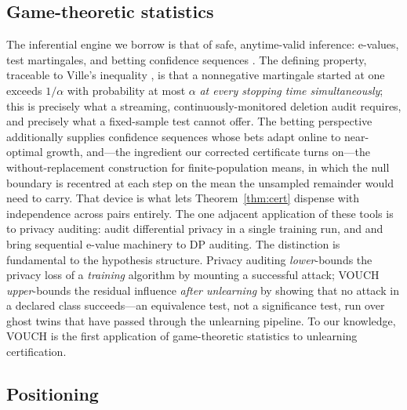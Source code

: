 \subsection{Game-theoretic statistics}

The inferential engine we borrow is that of safe, anytime-valid inference: e-values,
test martingales, and betting confidence sequences
\citep{ramdas2023game,grunwald2024safe,shafer2021testing,waudbysmith2024,howard2021time}.
The defining property, traceable to Ville's inequality \citep{ville1939}, is that a
nonnegative martingale started at one exceeds $1/\alpha$ with probability at most
$\alpha$ \emph{at every stopping time simultaneously}; this is precisely what a
streaming, continuously-monitored deletion audit requires, and precisely what a
fixed-sample test cannot offer. The betting perspective
\citep{waudbysmith2024,orabona2016coin} additionally supplies confidence sequences
whose bets adapt online to near-optimal growth, and---the ingredient our corrected
certificate turns on---the without-replacement construction for finite-population
means, in which the null boundary is recentred at each step on the mean the unsampled
remainder would need to carry. That device is what lets Theorem~\ref{thm:cert} dispense
with independence across pairs entirely. The one adjacent application of these tools
is to privacy auditing: \citet{steinke2023privacy} audit differential
privacy in a single training run, and \citet{gonzalez2025sequential} and
\citet{csillag2026dpevalues} bring sequential e-value machinery to DP auditing. The
distinction is fundamental to the hypothesis structure. Privacy auditing
\emph{lower}-bounds the privacy loss of a \emph{training} algorithm by mounting a
successful attack; VOUCH \emph{upper}-bounds the residual influence \emph{after
unlearning} by showing that no attack in a declared class succeeds---an equivalence
test, not a significance test, run over ghost twins that have passed through the
unlearning pipeline. To our knowledge, VOUCH is the first application of
game-theoretic statistics to unlearning certification.

\subsection{Positioning}

